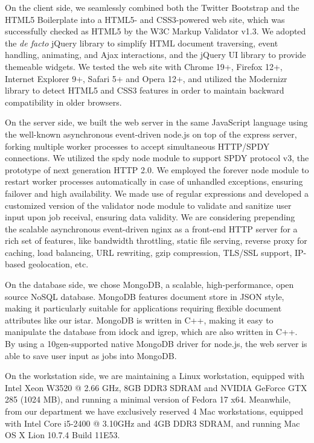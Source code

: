 \documentclass{bioinfo}
\begin{document}
On the client side, we seamlessly combined both the Twitter Bootstrap and the HTML5 Boilerplate into a HTML5- and CSS3-powered web site, which was successfully checked as HTML5 by the W3C Markup Validator v1.3. We adopted the \textit{de facto} jQuery library to simplify HTML document traversing, event handling, animating, and Ajax interactions, and the jQuery UI library to provide themeable widgets. We tested the web site with Chrome 19+, Firefox 12+, Internet Explorer 9+, Safari 5+ and Opera 12+, and utilized the Modernizr library to detect HTML5 and CSS3 features in order to maintain backward compatibility in older browsers.

On the server side, we built the web server in the same JavaScript language using the well-known asynchronous event-driven node.js on top of the express server, forking multiple worker processes to accept simultaneous HTTP/SPDY connections. We utilized the spdy node module to support SPDY protocol v3, the prototype of next generation HTTP 2.0. We employed the forever node module to restart worker processes automatically in case of unhandled exceptions, ensuring failover and high availability. We made use of regular expressions and developed a customized version of the validator node module to validate and sanitize user input upon job receival, ensuring data validity. We are considering prepending the scalable asynchronous event-driven nginx as a front-end HTTP server for a rich set of features, like bandwidth throttling, static file serving, reverse proxy for caching, load balancing, URL rewriting, gzip compression, TLS/SSL support, IP-based geolocation, etc.

On the database side, we chose MongoDB, a scalable, high-performance, open source NoSQL database. MongoDB features document store in JSON style, making it particularly suitable for applications requiring flexible document attributes like our istar. MongoDB is written in C++, making it easy to manipulate the database from idock and igrep, which are also written in C++. By using a 10gen-supported native MongoDB driver for node.js, the web server is able to save user input as jobs into MongoDB.

On the workstation side, we are maintaining a Linux workstation, equipped with Intel Xeon W3520 @ 2.66 GHz, 8GB DDR3 SDRAM and NVIDIA GeForce GTX 285 (1024 MB), and running a minimal version of Fedora 17 x64. Meanwhile, from our department we have exclusively reserved 4 Mac workstations, equipped with Intel Core i5-2400 @ 3.10GHz and 4GB DDR3 SDRAM, and running Mac OS X Lion 10.7.4 Build 11E53.
\end{document}
